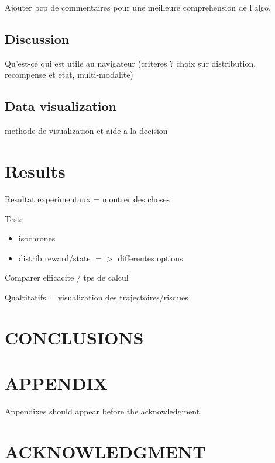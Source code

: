 \documentclass[letterpaper, 10 pt, conference]{ieeeconf}  %
\begin{document}
Ajouter bcp de commentaires pour une meilleure comprehension de l'algo.

\subsection{Discussion}
Qu'est-ce qui est utile au navigateur (criteres ? choix sur distribution, recompense et etat, multi-modalite)

\subsection{Data visualization}
methode de visualization et aide a la decision

\section{Results}
Resultat experimentaux = montrer des choses

Test:
\begin{itemize}
\item isochrones
\item distrib reward/state $=>$ differentes options
\end{itemize}

Comparer efficacite / tps de calcul

Qualtitatifs = visualization des trajectoires/risques

\section{CONCLUSIONS}


\addtolength{\textheight}{-12cm}   %







\section*{APPENDIX}

Appendixes should appear before the acknowledgment.

\section*{ACKNOWLEDGMENT}
\end{document}
